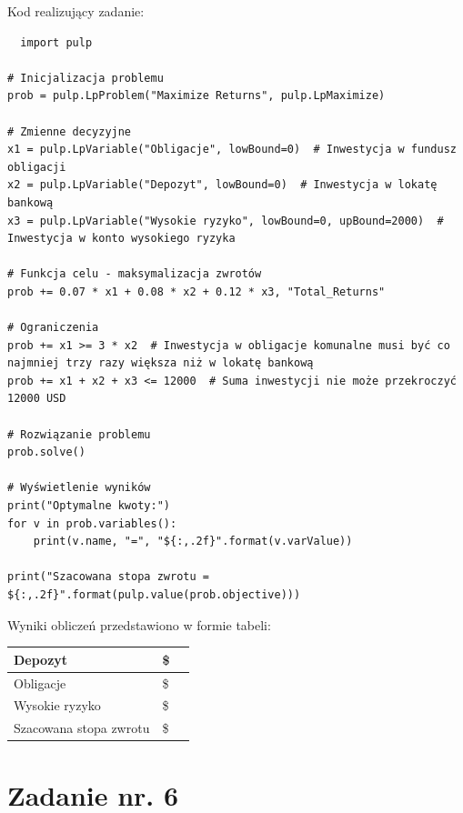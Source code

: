 \documentclass{article}
\begin{document}
Kod realizujący zadanie:
\begin{lstlisting}
  import pulp

# Inicjalizacja problemu
prob = pulp.LpProblem("Maximize Returns", pulp.LpMaximize)

# Zmienne decyzyjne
x1 = pulp.LpVariable("Obligacje", lowBound=0)  # Inwestycja w fundusz obligacji
x2 = pulp.LpVariable("Depozyt", lowBound=0)  # Inwestycja w lokatę bankową
x3 = pulp.LpVariable("Wysokie ryzyko", lowBound=0, upBound=2000)  # Inwestycja w konto wysokiego ryzyka

# Funkcja celu - maksymalizacja zwrotów
prob += 0.07 * x1 + 0.08 * x2 + 0.12 * x3, "Total_Returns"

# Ograniczenia
prob += x1 >= 3 * x2  # Inwestycja w obligacje komunalne musi być co najmniej trzy razy większa niż w lokatę bankową
prob += x1 + x2 + x3 <= 12000  # Suma inwestycji nie może przekroczyć 12000 USD

# Rozwiązanie problemu
prob.solve()

# Wyświetlenie wyników
print("Optymalne kwoty:")
for v in prob.variables():
    print(v.name, "=", "${:,.2f}".format(v.varValue))

print("Szacowana stopa zwrotu = ${:,.2f}".format(pulp.value(prob.objective)))
\end{lstlisting}

Wyniki obliczeń przedstawiono w formie tabeli:

\begin{tabularx}{0.8\textwidth} { 
  | >{\raggedright\arraybackslash}X 
  | >{\centering\arraybackslash}X 
  | >{\raggedleft\arraybackslash}X | }
 \hline
 Depozyt & 2500 \$  \\
 \hline
 Obligacje  & 7500 \$  \\
 \hline
 Wysokie ryzyko  & 2000 \$  \\
\hline
Szacowana stopa zwrotu  & 965 \$  \\
\hline
\end{tabularx}

\section{Zadanie nr. 6}
\end{document}
